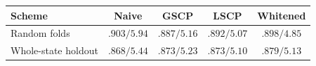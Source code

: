 \begin{tabular}{lcccc}
\toprule
Scheme & Naive & GSCP & LSCP & Whitened \\
\midrule
Random folds        & $.903/5.94$ & $.887/5.16$ & $.892/5.07$ & $.898/4.85$ \\
Whole-state holdout & $.868/5.44$ & $.873/5.23$ & $.873/5.10$ & $.879/5.13$ \\
\bottomrule
\end{tabular}

